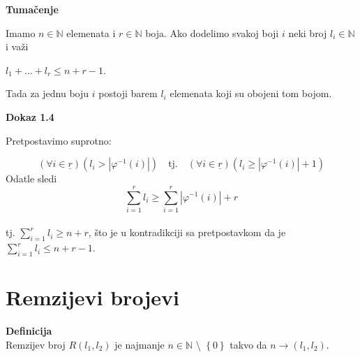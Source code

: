 \documentclass[12pt,a4paper]{article}
\begin{document}
	{\noindent\fontsize{12pt}{12pt}\textbf{Tumačenje}}
	\vspace{0.5em}

	\noindent Imamo $n \in \mathbb{N}$ elemenata i $r \in \mathbb{N}$ boja. Ako dodelimo svakoj boji $i$
	neki broj $l_{i} \in \mathbb{N}$ i važi
	\vspace{0.5em}

	\indent $l_{1}+\dots+l_{r} \leq n+r-1$.
	\vspace{0.5em}

	\noindent Tada za jednu boju $i$ postoji barem $l_{i}$ elemenata koji su obojeni tom bojom.

	\vspace{1.5em}

	{\noindent\fontsize{12pt}{12pt}\textbf{Dokaz 1.4}}
	\vspace{0.5em}

	\noindent Pretpostavimo suprotno:

	\[(\forall i \in \underline{r}) (l_{i} > |\varphi^{-1}(i)|) \quad \text{tj.}\quad (\forall i \in \underline{r})(l_{i} \geq |\varphi^{-1}(i)|+1)\]
	Odatle sledi \[ \sum_{i=1}^{r} l_{i} \geq \sum_{i=1}^{r}|\varphi^{-1}(i)|+r\] 
	\\tj. $ \sum_{i=1}^{r} l_{i} \geq n+r$,
	što je u kontradikciji sa pretpostavkom da je $\sum_{i=1}^{r} l_{i} \leq n+r-1$.


	\newpage
	
	
	\section{Remzijevi brojevi}
	\vspace{1em}
	{\fontsize{12pt}{12pt}\textbf{Definicija}}
	\vspace{0.5em}	
	\\
	Remzijev broj $R(l_{1}, l_{2})$ je najmanje $n \in \mathbb{N}$ \textbackslash {} $\left\lbrace 0\right\rbrace $ takvo da $n\rightarrow(l_{1}, l_{2})$.
	
\end{document}
